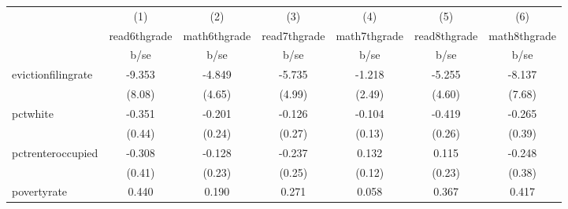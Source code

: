 {
\def\sym#1{\ifmmode^{#1}\else\(^{#1}\)\fi}
\begin{tabular}{l*{6}{c}}
\hline\hline
            &\multicolumn{1}{c}{(1)}           &\multicolumn{1}{c}{(2)}           &\multicolumn{1}{c}{(3)}           &\multicolumn{1}{c}{(4)}           &\multicolumn{1}{c}{(5)}           &\multicolumn{1}{c}{(6)}           \\
            &\multicolumn{1}{c}{read6thgrade}  &\multicolumn{1}{c}{math6thgrade}  &\multicolumn{1}{c}{read7thgrade}  &\multicolumn{1}{c}{math7thgrade}  &\multicolumn{1}{c}{read8thgrade}  &\multicolumn{1}{c}{math8thgrade}  \\
            &                     b/se         &                     b/se         &                     b/se         &                     b/se         &                     b/se         &                     b/se         \\
\hline
evictionfilingrate&                   -9.353         &                   -4.849         &                   -5.735         &                   -1.218         &                   -5.255         &                   -8.137         \\
            &                   (8.08)         &                   (4.65)         &                   (4.99)         &                   (2.49)         &                   (4.60)         &                   (7.68)         \\
pctwhite    &                   -0.351         &                   -0.201         &                   -0.126         &                   -0.104         &                   -0.419         &                   -0.265         \\
            &                   (0.44)         &                   (0.24)         &                   (0.27)         &                   (0.13)         &                   (0.26)         &                   (0.39)         \\
pctrenteroccupied&                   -0.308         &                   -0.128         &                   -0.237         &                    0.132         &                    0.115         &                   -0.248         \\
            &                   (0.41)         &                   (0.23)         &                   (0.25)         &                   (0.12)         &                   (0.23)         &                   (0.38)         \\
povertyrate &                    0.440         &                    0.190         &                    0.271         &                    0.058         &                    0.367         &                    0.417         \\

\end{tabular}}
